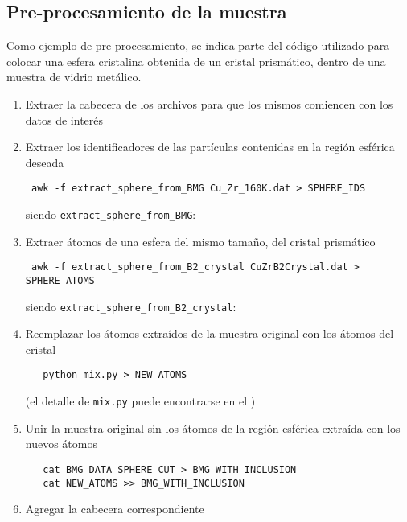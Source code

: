 \subsection{Pre-procesamiento de la muestra}

Como ejemplo de pre-procesamiento, se indica parte del código utilizado para colocar una esfera cristalina obtenida de un cristal prismático, dentro de una muestra de vidrio metálico.

\begin{enumerate}
 \item Extraer la cabecera de los archivos para que los mismos  comiencen con los datos de interés
 \item Extraer los identificadores de las partículas contenidas en la región esférica deseada \\
 \begin{lstlisting}
 awk -f extract_sphere_from_BMG Cu_Zr_160K.dat > SPHERE_IDS
  \end{lstlisting}
  siendo \lstinline[language=bash]|extract_sphere_from_BMG|:\\  
 
 \item Extraer átomos de una esfera del mismo tamaño, del cristal prismático \\
  \begin{lstlisting}
 awk -f extract_sphere_from_B2_crystal CuZrB2Crystal.dat > SPHERE_ATOMS
  \end{lstlisting}
  siendo \lstinline[language=bash]|extract_sphere_from_B2_crystal|:\\  
  
  \item Reemplazar los átomos extraídos de la muestra original con los átomos del cristal \\
  \begin{lstlisting}
   python mix.py > NEW_ATOMS
  \end{lstlisting}
  (el detalle de \lstinline[language=bash]|mix.py| puede encontrarse en el  )
  \item Unir la muestra original sin los átomos de la región esférica extraída con los nuevos átomos \\  
  \begin{lstlisting}
   cat BMG_DATA_SPHERE_CUT > BMG_WITH_INCLUSION
   cat NEW_ATOMS >> BMG_WITH_INCLUSION
  \end{lstlisting}
  \item Agregar la cabecera correspondiente
\end{enumerate}


